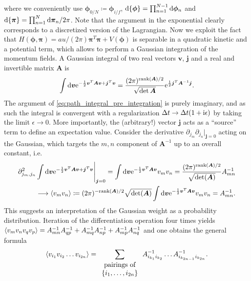 where we conveniently use $\bm\phi_{0/N}\coloneqq \bm\phi_{i/f}$, $\mathrm d\{\bm\phi\}=\prod_{n=1}^{N-1}\mathrm d\bm\phi_n$ and $\mathrm d\{\bm\pi\}=\prod_{n=1}^N\mathrm d\bm\pi_n/2\pi$.
Note that the argument in the exponential clearly corresponds to a discretized version of the Lagrangian.
Now we exploit the fact that $H(\bm\phi,\bm\pi)=au/(2\pi)\bm\pi^T\bm\pi + V(\bm\phi)$ is separable in a quadratic kinetic and a potential term, which allows to perform a Gaussian integration of the momentum fields.
A Gaussian integral of two real vectors $\bm v$, $\bm j$ and a real and invertible matrix $\bm A$ is
\begin{align}
    \int\mathrm d\bm v\mathrm e^{-\frac12\bm v^T\bm A\bm v + \bm j^T\bm v} = \frac{(2\pi)^{{\rm rank}(\bm A)/2}}{\sqrt{\det\bm A}}\mathrm e^{\frac12\bm j^T\bm A^{-1}\bm j}.
    \label{eq:multi_gaussian}
\end{align}
The argument of \cref{eq:path_integral_pre_integration} is purely imaginary, and as such the integral is convergent with a regularization $\Delta t\rightarrow\Delta t(1+\mathrm i\epsilon)$ by taking the limit $\epsilon\rightarrow0$.
More importantly, the (arbitrary!) vector $\bm j$ acts as a ``source'' term to define an expectation value.
Consider the derivative $\partial_{j_m}\partial_{j_n}|_{\bm j=0}$ acting on the Gaussian, which targets the $m,n$ component of $\bm A^{-1}$ up to an overall constant, i.e.
\begin{align}
    \partial^2_{j_m,j_n}\int\mathrm d\bm v\mathrm e^{-\frac12\bm v^T\bm A\bm v + \bm j^T \bm v}\Bigg|_{\bm j=0}
    =
    \int\mathrm d\bm v\mathrm e^{-\frac12\bm v^T\bm A\bm v}v_mv_n
    =
    \frac{(2\pi)^{{\rm rank}(\bm A)/2}}{\sqrt{\det(\bm A)}}A^{-1}_{mn}
    \\
    \longrightarrow \braket{v_mv_n}\coloneqq (2\pi)^{-{\rm rank}(\bm A)/2}\sqrt{\det(\bm A)}\int\mathrm d\bm v\mathrm e^{-\frac12\bm v^T\bm A\bm v}v_mv_n = A_{mn}^{-1}.
    \label{eq:multi_source}
\end{align}
This suggests an interpretation of the Gaussian weight as a probability distribution.
Iteration of the differentiation operation four times yields $\braket{v_mv_nv_qv_p}=A^{-1}_{mn}A^{-1}_{qp}+A^{-1}_{mq}A^{-1}_{np}+A^{-1}_{mp}A^{-1}_{nq}$ and one obtains the general formula
\begin{align}
    \braket{v_{i_1}v_{i_2}\dots v_{i_{2n}}} =
    \sum_{\begin{array}{c}\text{pairings of}\\ \{i_1,\dots,i_{2n}\}\end{array}}
    A^{-1}_{i_{k_1}i_{k_2}}\dots A^{-1}_{i_{k_{2n-1}}i_{k_{2n}}}.
\end{align}
